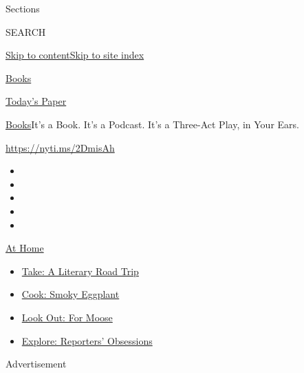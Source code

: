 Sections

SEARCH

\protect\hyperlink{site-content}{Skip to
content}\protect\hyperlink{site-index}{Skip to site index}

\href{https://www.nytimes.com/section/books}{Books}

\href{https://myaccount.nytimes.com/auth/login?response_type=cookie\&client_id=vi}{}

\href{https://www.nytimes.com/section/todayspaper}{Today's Paper}

\href{/section/books}{Books}\textbar{}It's a Book. It's a Podcast. It's
a Three-Act Play, in Your Ears.

\url{https://nyti.ms/2DmisAh}

\begin{itemize}
\item
\item
\item
\item
\item
\end{itemize}

\href{https://www.nytimes.com/spotlight/at-home?action=click\&pgtype=Article\&state=default\&region=TOP_BANNER\&context=at_home_menu}{At
Home}

\begin{itemize}
\tightlist
\item
  \href{https://www.nytimes.com/2020/07/28/books/time-for-a-literary-road-trip.html?action=click\&pgtype=Article\&state=default\&region=TOP_BANNER\&context=at_home_menu}{Take:
  A Literary Road Trip}
\item
  \href{https://www.nytimes.com/2020/07/29/magazine/bored-with-your-home-cooking-some-smoky-eggplant-will-fix-that.html?action=click\&pgtype=Article\&state=default\&region=TOP_BANNER\&context=at_home_menu}{Cook:
  Smoky Eggplant}
\item
  \href{https://www.nytimes.com/2020/07/27/travel/moose-michigan-isle-royale.html?action=click\&pgtype=Article\&state=default\&region=TOP_BANNER\&context=at_home_menu}{Look
  Out: For Moose}
\item
  \href{https://www.nytimes.com/interactive/2020/at-home/even-more-reporters-editors-diaries-lists-recommendations.html?action=click\&pgtype=Article\&state=default\&region=TOP_BANNER\&context=at_home_menu}{Explore:
  Reporters' Obsessions}
\end{itemize}

Advertisement

